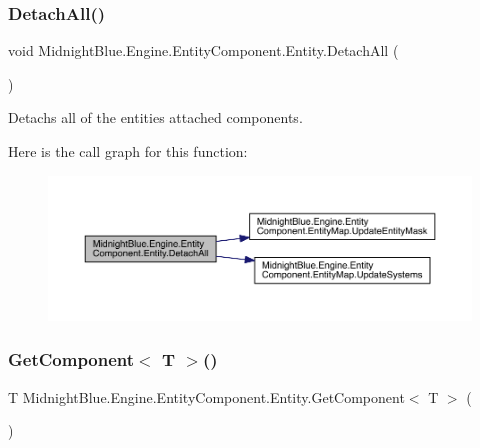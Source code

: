 \subsubsection{\texorpdfstring{Detach\+All()}{DetachAll()}}
{\footnotesize\ttfamily void Midnight\+Blue.\+Engine.\+Entity\+Component.\+Entity.\+Detach\+All (\begin{DoxyParamCaption}{ }\end{DoxyParamCaption})\hspace{0.3cm}{\ttfamily [inline]}}



Detachs all of the entities attached components. 

Here is the call graph for this function\+:
\nopagebreak
\begin{figure}[H]
\begin{center}
\leavevmode
\includegraphics[width=350pt]{class_midnight_blue_1_1_engine_1_1_entity_component_1_1_entity_a2109f26da3d9f33ff2ab950498e87782_cgraph}
\end{center}
\end{figure}
\hypertarget{class_midnight_blue_1_1_engine_1_1_entity_component_1_1_entity_a897432decc39ee42eac559e88cab20a7}{}\label{class_midnight_blue_1_1_engine_1_1_entity_component_1_1_entity_a897432decc39ee42eac559e88cab20a7} 
\subsubsection{\texorpdfstring{Get\+Component$<$ T $>$()}{GetComponent< T >()}}
{\footnotesize\ttfamily T Midnight\+Blue.\+Engine.\+Entity\+Component.\+Entity.\+Get\+Component$<$ T $>$ (\begin{DoxyParamCaption}{ }\end{DoxyParamCaption})\hspace{0.3cm}{\ttfamily [inline]}}




